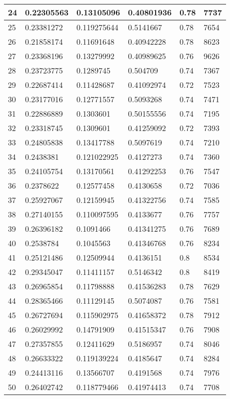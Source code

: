 \begin{longtable}{|l|l|l|l|l|l|}
24 & 0.22305563 & 0.13105096 & 0.40801936 & 0.78 & 7737 \\ \hline 
25 & 0.23381272 & 0.119275644 & 0.5141667 & 0.78 & 7654 \\ \hline 
26 & 0.21858174 & 0.11691648 & 0.40942228 & 0.78 & 8623 \\ \hline 
27 & 0.23368196 & 0.13279992 & 0.40989625 & 0.76 & 9626 \\ \hline 
28 & 0.23723775 & 0.1289745 & 0.504709 & 0.74 & 7367 \\ \hline 
29 & 0.22687414 & 0.11428687 & 0.41092974 & 0.72 & 7523 \\ \hline 
30 & 0.23177016 & 0.12771557 & 0.5093268 & 0.74 & 7471 \\ \hline 
31 & 0.22886889 & 0.1303601 & 0.50155556 & 0.74 & 7195 \\ \hline 
32 & 0.23318745 & 0.1309601 & 0.41259092 & 0.72 & 7393 \\ \hline 
33 & 0.24805838 & 0.13417788 & 0.5097619 & 0.74 & 7210 \\ \hline 
34 & 0.2438381 & 0.121022925 & 0.4127273 & 0.74 & 7360 \\ \hline 
35 & 0.24105754 & 0.13170561 & 0.41292253 & 0.76 & 7547 \\ \hline 
36 & 0.2378622 & 0.12577458 & 0.4130658 & 0.72 & 7036 \\ \hline 
37 & 0.25927067 & 0.12159945 & 0.41322756 & 0.74 & 7585 \\ \hline 
38 & 0.27140155 & 0.110097595 & 0.4133677 & 0.76 & 7757 \\ \hline 
39 & 0.26396182 & 0.1091466 & 0.41341275 & 0.76 & 7689 \\ \hline 
40 & 0.2538784 & 0.1045563 & 0.41346768 & 0.76 & 8234 \\ \hline 
41 & 0.25121486 & 0.12509944 & 0.4136151 & 0.8 & 8534 \\ \hline 
42 & 0.29345047 & 0.11411157 & 0.5146342 & 0.8 & 8419 \\ \hline 
43 & 0.26965854 & 0.11798888 & 0.41536283 & 0.78 & 7629 \\ \hline 
44 & 0.28365466 & 0.11129145 & 0.5074087 & 0.76 & 7581 \\ \hline 
45 & 0.26727694 & 0.115902975 & 0.41658372 & 0.78 & 7912 \\ \hline 
46 & 0.26029992 & 0.14791909 & 0.41515347 & 0.76 & 7908 \\ \hline 
47 & 0.27357855 & 0.12411629 & 0.5186957 & 0.74 & 8046 \\ \hline 
48 & 0.26633322 & 0.119139224 & 0.4185647 & 0.74 & 8284 \\ \hline 
49 & 0.24413116 & 0.13566707 & 0.4191568 & 0.74 & 7976 \\ \hline 
50 & 0.26402742 & 0.118779466 & 0.41974413 & 0.74 & 7708 \\ \hline 
\end{longtable}